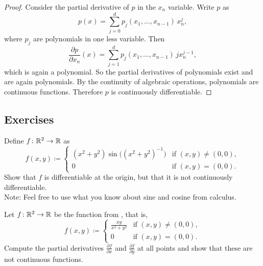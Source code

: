 \begin{proof}
Consider the partial derivative of $p$ in the $x_n$ variable.
Write $p$ as
\begin{equation*}
p(x) = \sum_{j=0}^d p_j(x_1,\ldots,x_{n-1}) \, x_n^j ,
\end{equation*}
where $p_j$ are polynomials in one less variable.
Then
\begin{equation*}
\frac{\partial p}{\partial x_n}(x)
= \sum_{j=1}^d p_j(x_1,\ldots,x_{n-1}) \, j x_n^{j-1} ,
\end{equation*}
which is again a polynomial.
So the partial derivatives of polynomials exist and are again polynomials.
By the continuity of algebraic operations, polynomials are continuous functions.
Therefore $p$ is continuously differentiable.
\end{proof}

\subsection{Exercises}

\begin{exercise}
Define $f \colon {\mathbb{R}}^2 \to {\mathbb{R}}$ as
\begin{equation*}
f(x,y) \coloneqq
\begin{cases}
(x^2+y^2)\sin\bigl({(x^2+y^2)}^{-1}\bigr) & \text{if } (x,y) \not= (0,0), \\
0                                         & \text{if } (x,y) = (0,0).
\end{cases}
\end{equation*}
Show that $f$ is differentiable at the origin, but that it is not 
continuously differentiable.
\\
Note: Feel free to use what you know about sine and cosine from calculus.
\end{exercise}

\begin{exercise}
Let $f \colon {\mathbb{R}}^2 \to {\mathbb{R}}$ be the function from
, that is,
\begin{equation*}
f(x,y)
\coloneqq
\begin{cases}
\frac{xy}{x^2+y^2} & \text{if } (x,y) \not= (0,0), \\
0                  & \text{if } (x,y) = (0,0).
\end{cases}
\end{equation*}
Compute the partial derivatives 
$\frac{\partial f}{\partial x}$ and
$\frac{\partial f}{\partial y}$ at all points and show that these are not
continuous functions.
\end{exercise}

